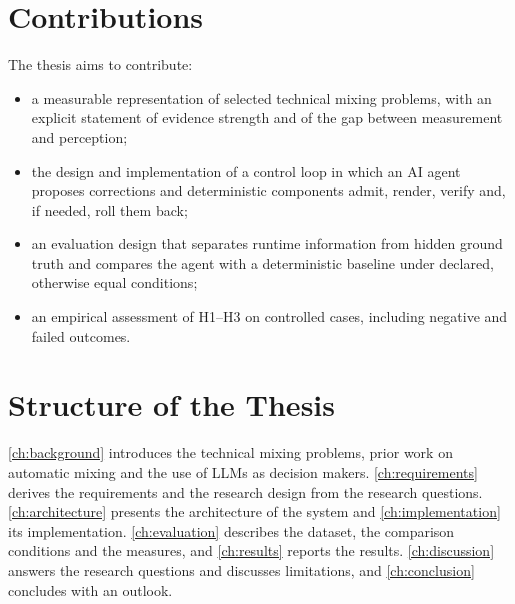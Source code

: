 \section{Contributions}
\label{sec:intro-contributions}

The thesis aims to contribute:

\begin{itemize}
	\item a measurable representation of selected technical mixing problems, with an explicit statement of evidence strength and of the gap between measurement and perception;
	\item the design and implementation of a control loop in which an \ac{AI} agent proposes corrections and deterministic components admit, render, verify and, if needed, roll them back;
	\item an evaluation design that separates runtime information from hidden ground truth and compares the agent with a deterministic baseline under declared, otherwise equal conditions;
	\item an empirical assessment of H1--H3 on controlled cases, including negative and failed outcomes.
\end{itemize}


\section{Structure of the Thesis}
\label{sec:intro-structure}

\autoref{ch:background} introduces the technical mixing problems, prior work on automatic mixing and the use of \acsp{LLM} as decision makers. \autoref{ch:requirements} derives the requirements and the research design from the research questions. \autoref{ch:architecture} presents the architecture of the system and \autoref{ch:implementation} its implementation. \autoref{ch:evaluation} describes the dataset, the comparison conditions and the measures, and \autoref{ch:results} reports the results. \autoref{ch:discussion} answers the research questions and discusses limitations, and \autoref{ch:conclusion} concludes with an outlook.
